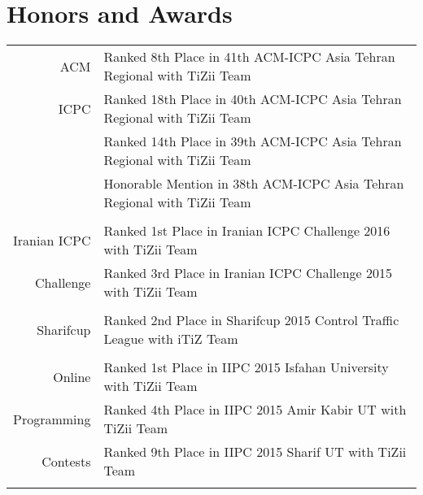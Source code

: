 \documentclass[a4paper,10pt]{article}
\newcommand{\linkSign}{
	{\footnotesize\space\faExternalLink}}
\newcommand{\ICPCLink}{https://icpc.baylor.edu/ICPCID/AW4BCNUI7GGZ}
\newcommand{\IndeedPrimePage}{https://www.hackerrank.com/indeed-prime-codesprint}
\newcommand{\IndeedPrimeRanks}{https://www.hackerrank.com/contests/indeed-prime-codesprint/leaderboard/10}
\newcommand{\SharifcupLink}{http://sharifcup.sharif.ir/\#!p=1036}
\newcommand{\ICPCChLink}{http://icpc.sharif.edu/acmicpc15/challenge-tournament/}
\begin{document}
	\section{Honors and Awards}
	\begin{tabular}{r|p{11cm}}
		\textnormal{ACM} & {\small Ranked 8th Place in 41th ACM-ICPC Asia Tehran Regional with TiZii Team}\href{\ICPCLink}{\linkSign} \\
		\textnormal{ICPC} & {\small Ranked 18th Place in 40th ACM-ICPC Asia Tehran Regional with TiZii Team}\href{\ICPCLink}{\linkSign} \\
		\textnormal{} & {\small Ranked 14th Place in 39th ACM-ICPC Asia Tehran Regional with TiZii Team}\href{\ICPCLink}{\linkSign} \\
		\textnormal{}& {\small Honorable Mention in 38th ACM-ICPC Asia Tehran Regional with TiZii Team}\href{\ICPCLink}{\linkSign}\\
		\multicolumn{2}{c}{} \\
		
		
		\textnormal{Iranian ICPC} & {\small Ranked 1st Place in Iranian ICPC Challenge 2016 with TiZii Team}\href{\ICPCChLink}{\linkSign} \\
		\textnormal{Challenge} & {\small Ranked 3rd Place in Iranian ICPC Challenge 2015 with TiZii Team}\href{\ICPCChLink}{\linkSign} \\
		\multicolumn{2}{c}{} \\
		
		\textnormal{Sharifcup} & {\small Ranked 2nd Place in Sharifcup 2015 Control Traffic League with iTiZ Team}\href{\SharifcupLink}{\linkSign}\\
		\multicolumn{2}{c}{} \\
		
		\textnormal{Online} & {\small Ranked 1st Place in IIPC 2015 Isfahan University with TiZii Team} \href{\ICPCLink}{\linkSign}\\
		\textnormal{Programming} & {\small Ranked 4th Place in IIPC 2015 Amir Kabir UT with TiZii Team\href{\ICPCLink}{\linkSign}}\\
		\textnormal{Contests} & {\small Ranked 9th Place in IIPC 2015 Sharif UT with TiZii Team}\href{\ICPCLink}{\linkSign}\\
		\multicolumn{2}{c}{} \\
		

\end{tabular}
\end{document}
